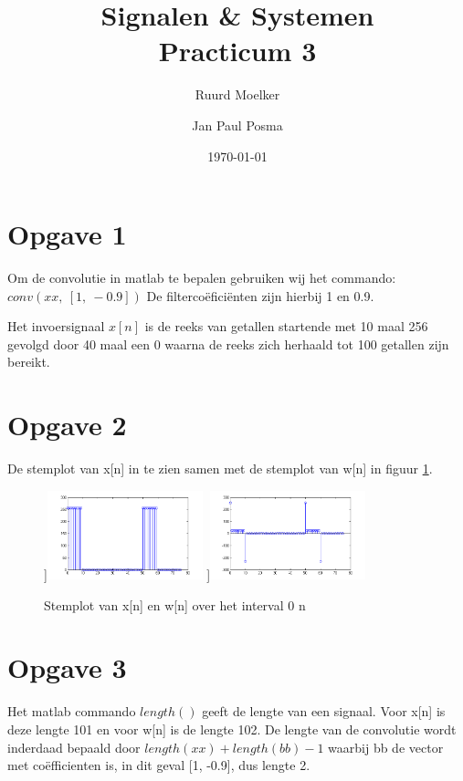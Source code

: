 \documentclass{article}
\author{Ruurd Moelker \and Jan Paul Posma}
\date{\today}
\title{Signalen \& Systemen \\Practicum 3}
\begin{document}
\maketitle
 
\section{Opgave 1}
Om de convolutie in matlab te bepalen gebruiken wij het commando:
$conv(xx,~[1,~-0.9])$
De filterco\"efici\"enten zijn hierbij 1 en 0.9.

Het invoersignaal $x[n]$ is de reeks van getallen startende met 10 maal 256 gevolgd door 40 maal een 0 waarna de reeks zich herhaald tot 100 getallen zijn bereikt.

\section{Opgave 2}
De stemplot van x[n] in te zien samen met de stemplot van w[n] in figuur \ref{fig:opgave2}.

\begin{figure}[h]
  \centering
 	\subfloat[][x[n]]{\includegraphics[width=0.4\textwidth]{content/2xx.png}}
	\subfloat[][w[n]]{\includegraphics[width=0.4\textwidth]{content/2ww.png}}
  \caption{Stemplot van x[n] en w[n] over het interval 0 \lte n }
  \label{fig:opgave2}
\end{figure}

\section{Opgave 3}
Het matlab commando $length()$ geeft de lengte van een signaal. Voor x[n] is deze lengte 101 en voor w[n] is de lengte 102. De lengte van de convolutie wordt inderdaad bepaald door $length(xx)+length(bb)-1$ waarbij bb de vector met co\"efficienten is, in dit geval [1, -0.9], dus lengte 2.
\end{document}
